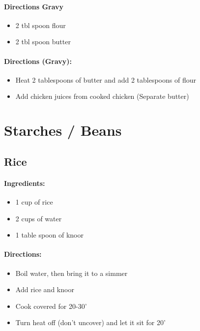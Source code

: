 \documentclass{article}
\begin{document}
\paragraph{Directions Gravy}
\begin{itemize}
	\item 2 tbl spoon flour
	\item 2 tbl spoon butter
\end{itemize}

\paragraph{Directions (Gravy):}
\begin{itemize}
	\item Heat 2 tablespoons of butter and add 2 tablespoons of flour
	\item Add chicken juices from cooked chicken (Separate butter)
\end{itemize}

\section{Starches / Beans}

\subsection{Rice}

\paragraph{Ingredients:}

\begin{itemize}
	\item 1 cup of rice
	\item 2 cups of water
	\item 1 table spoon of knoor
\end{itemize}

\paragraph{Directions:}
\begin{itemize}
	\item Boil water, then bring it to a simmer
	\item Add rice and knoor
	\item Cook covered for 20-30'
	\item Turn heat off (don't uncover) and let it sit for 20'
\end{itemize} 
\end{document}
